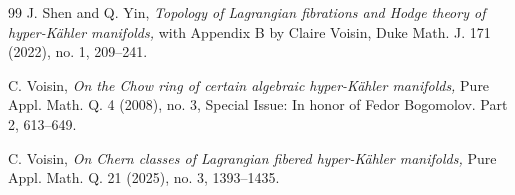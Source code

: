 \documentclass[11pt]{amsart}
\theoremstyle{plain}
\theoremstyle{definition}
\theoremstyle{remark}
\begin{document}
\begin{thebibliography}{99}
 J. Shen and Q. Yin, {\em Topology of Lagrangian fibrations and Hodge theory of hyper-K\"ahler manifolds,} with Appendix B by Claire Voisin, Duke Math. J. 171 (2022), no. 1, 209--241.


 C. Voisin, {\em On the Chow ring of certain algebraic hyper-K\"ahler manifolds,} Pure Appl. Math. Q. 4 (2008), no. 3, Special Issue: In honor of Fedor Bogomolov. Part 2, 613--649.

 C. Voisin, {\em On Chern classes of Lagrangian fibered hyper-K\"ahler manifolds,} Pure Appl. Math. Q. 21 (2025), no. 3, 1393--1435.





\end{thebibliography}
\end{document}

